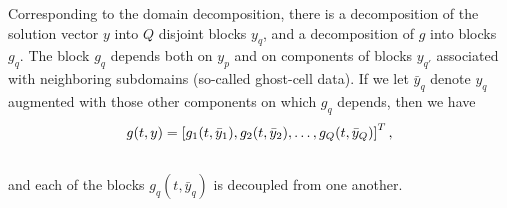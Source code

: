 \documentclass[letterpaper,10pt,english]{sphinxmanual}
\begin{document}
Corresponding to the domain decomposition, there is a decomposition of
the solution vector $y$ into $Q$ disjoint blocks
$y_q$, and a decomposition of $g$ into blocks
$g_q$. The block $g_q$ depends both on $y_p$ and on
components of blocks $y_{q'}$ associated with neighboring
subdomains (so-called ghost-cell data).  If we let $\bar{y}_q$
denote $y_q$ augmented with those other components on which
$g_q$ depends, then we have
\begin{gather}
\begin{split}g(t,y) = \left[ g_1(t,\bar{y}_1), g_2(t,\bar{y}_2), \ldots , g_Q(t,\bar{y}_Q) \right]^T,\end{split}\notag\\\begin{split}\end{split}\notag
\end{gather}
and each of the blocks $g_q(t,\bar{y}_q)$ is decoupled from one another.
\end{document}
